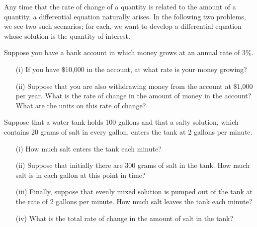 \begin{pa} \label{PA:7.5}
Any time that the rate of change of a quantity is related to the amount of a quantity, a differential equation naturally arises.  In the following two problems, we see two such scenarios; for each, we want to develop a differential equation whose solution is the quantity of interest.
  \ba
\item Suppose you have a bank account in which money grows at an
  annual rate of 3\%.
  \begin{itemize}
    \item[(i)] If you have \$10,000 in the account, at what rate is your
      money growing?
    \item[(ii)] Suppose that you are also withdrawing money from the account
      at \$1,000 per year.  What is the rate of change in the amount
      of money in the account?  What are the units on this rate of change? 
  \end{itemize}
\item Suppose that a water tank holds 100 gallons and that a salty
  solution, which contains 20 grams of salt in every gallon, enters the
  tank at 2 gallons per minute.   
  \begin{itemize}
    \item[(i)] How much salt enters the tank each minute?
    \item[(ii)] Suppose that initially there are 300 grams of salt in the tank.  How
      much salt is in each gallon at this point in time?
    \item[(iii)] Finally, suppose that evenly mixed solution is pumped out of the tank at the
      rate of 2 gallons per minute.  How much salt leaves the tank
      each minute?
    \item[(iv)] What is the total rate of change in the amount of salt in
      the tank?
  \end{itemize}
\ea
\end{pa} 
\afterpa
